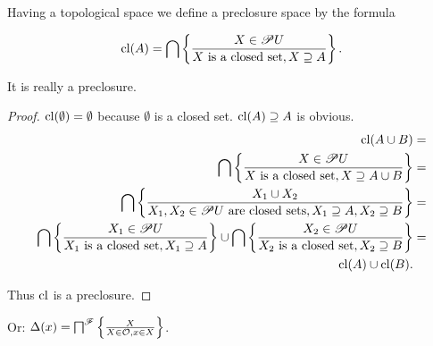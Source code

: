 Having a topological space we define a preclosure space by the formula

\[
\operatorname{cl}(A)=\bigcap\left\{ \frac{X\in\mathscr{P} U}{X\text{ is a closed set},X\supseteq A}\right\}.
\]

\begin{prop}
It is really a preclosure.\end{prop}
\begin{proof}
$\operatorname{cl}(\emptyset)=\emptyset$ because $\emptyset$ is a closed set.
$\operatorname{cl}(A)\supseteq A$ is obvious.
\begin{align*}
\operatorname{cl}(A\cup B) & =\\
\bigcap\left\{ \frac{X\in\mathscr{P} U}{X\text{ is a closed set},X\supseteq A\cup B}\right\} & =\\
\bigcap\left\{ \frac{X_{1}\cup X_{2}}{X_{1},X_{2}\in\mathscr{P} U\text{ are closed sets},X_{1}\supseteq A,X_{2}\supseteq B}\right\} & =\\
\bigcap\left\{ \frac{X_{1}\in\mathscr{P} U}{X_{1}\text{ is a closed set},X_{1}\supseteq A}\right\}\cup\bigcap\left\{ \frac{X_{2}\in\mathscr{P} U}{X_{2}\text{ is a closed set},X_{2}\supseteq B}\right\} & =\\
\operatorname{cl}(A)\cup\operatorname{cl}(B).
\end{align*}


Thus $\operatorname{cl}$ is a preclosure.
\end{proof}
Or: $\Delta(x)=\bigsqcap^{\mathscr{F}}\left\{ \frac{X}{X\in\mathcal{O},x\in X}\right\}$.

